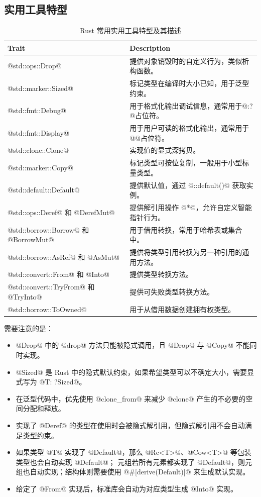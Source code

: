 \subsection{实用工具特型}
\begin{table}[ht]
	\centering
	\begin{tabular}{|l|p{24em}|}
		\hline
		\textbf{Trait}                      & \textbf{Description}         \\
		\hline
		@std::ops::Drop@                    & 提供对象销毁时的自定义行为，类似析构函数。        \\
		@std::marker::Sized@                & 标记类型在编译时大小已知，用于泛型约束。         \\
		@std::fmt::Debug@                   & 用于格式化输出调试信息，通常用于@{:?}@占位符。   \\
		@std::fmt::Display@                 & 用于用户可读的格式化输出，通常用于@{}@占位符。    \\
		@std::clone::Clone@                 & 实现值的显式深拷贝。                   \\
		@std::marker::Copy@                 & 标记类型可按位复制，一般用于小型标量类型。        \\
		@std::default::Default@             & 提供默认值，通过 @::default()@ 获取实例。 \\
		@std::ops::Deref@ 和 @DerefMut@      & 提供解引用操作 @*@，允许自定义智能指针行为。     \\
		@std::borrow::Borrow@ 和 @BorrowMut@ & 用于借用转换，常用于哈希表或集合中。           \\
		@std::borrow::AsRef@ 和 @AsMut@      & 提供将类型引用转换为另一种引用的通用方法。        \\
		@std::convert::From@ 和 @Into@       & 提供类型转换方法。                    \\
		@std::convert::TryFrom@ 和 @TryInto@ & 提供可失败类型转换方法。                 \\
		@std::borrow::ToOwned@              & 用于从借用数据创建拥有权类型。              \\
		\hline
	\end{tabular}
	\caption{Rust 常用实用工具特型及其描述}
\end{table}
需要注意的是：
\begin{itemize}[itemsep=0pt, parsep=0pt]
	\item @Drop@ 中的 @drop@ 方法只能被隐式调用，且 @Drop@ 与 @Copy@ 不能同时实现。
	\item @Sized@ 是 Rust 中的隐式默认约束，如果希望类型可以不确定大小，需要显式写为 @T: ?Sized@。
	\item 在泛型代码中，优先使用 @clone_from@ 来减少 @clone@ 产生的不必要的空间分配和释放。
	\item 实现了 @Deref@ 的类型在使用时会被隐式解引用，但隐式解引用不会自动满足类型约束。
	\item 如果类型 @T@ 实现了 @Default@，那么 @Rc<T>@、@Cow<T>@ 等包装类型也会自动实现 @Default@；
	      元组若所有元素都实现了 @Default@，则元组也自动实现；结构体则需要使用 @#[derive(Default)]@ 来生成默认实现。
	\item 给定了 @From@ 实现后，标准库会自动为对应类型生成 @Into@ 实现。
\end{itemize}
